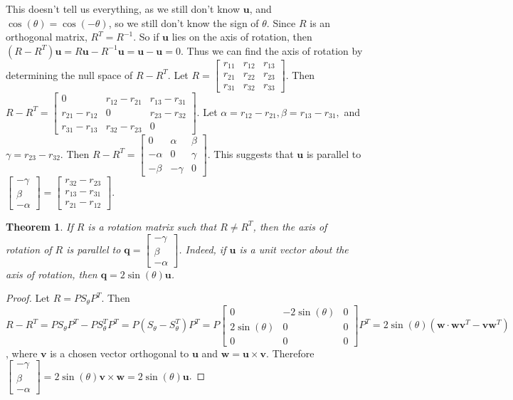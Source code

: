 \documentclass[oneside]{book}
\newtheorem{theorem}{Theorem}[section]
\theoremstyle{definition}
\newcommand*\B[1]{\mathbf{#1}}
\begin{document}
This doesn't tell us everything, as we still don't know $\B{u}$, and $\cos(\theta) = \cos(-\theta)$, so we still don't know the sign of $\theta$. Since $R$ is an orthogonal matrix, $R^T = R^{-1}$. So if $\B{u}$ lies on the axis of rotation, then $(R-R^T)\B{u} = R\B{u}-R^{-1}\B{u} = \B{u}-\B{u} = 0$. Thus we can find the axis of rotation by determining the null space of $R-R^T$. Let $R = \begin{bmatrix} r_{11} & r_{12} & r_{13} \\ r_{21} & r_{22} & r_{23} \\ r_{31} & r_{32} & r_{33} \end{bmatrix}$. Then $R-R^T = \begin{bmatrix} 0 & r_{12} - r_{21} & r_{13} - r_{31} \\ r_{21} - r_{12} & 0 & r_{23}-r_{32} \\ r_{31} - r_{13} & r_{32} - r_{23} & 0 \end{bmatrix}$. Let $\alpha = r_{12} - r_{21},\beta = r_{13} - r_{31},$ and $\gamma = r_{23}-r_{32}$. Then $R-R^T = \begin{bmatrix} 0 & \alpha & \beta \\ -\alpha & 0 & \gamma \\ -\beta & -\gamma & 0 \end{bmatrix}$. This suggests that $\B{u}$ is parallel to $\begin{bmatrix} -\gamma \\ \beta \\ -\alpha \end{bmatrix} = \begin{bmatrix} r_{32}-r_{23} \\ r_{13}-r_{31} \\ r_{21}-r_{12} \end{bmatrix}$.

\begin{theorem}
If $R$ is a rotation matrix such that $R\ne R^T$, then the axis of rotation of $R$ is parallel to $\B{q}=\begin{bmatrix}-\gamma \\ \beta \\ -\alpha\end{bmatrix}$. Indeed, if $\B{u}$ is a unit vector about the axis of rotation, then $\B{q} = 2\sin(\theta)\B{u}$.
\end{theorem}
\begin{proof}
Let $R = PS_{\theta}P^T$. Then $R-R^T = PS_{\theta}P^T - PS_{\theta}^TP^T = P(S_{\theta}-S_{\theta}^T)P^T = P\begin{bmatrix}0 & -2\sin(\theta) & 0 \\ 2\sin(\theta) & 0 & 0 \\ 0 & 0 & 0 \end{bmatrix}P^T = 2\sin(\theta)(\B{w}\cdot \B{w}\B{v}^T - \B{v}\B{w}^T)$, where $\B{v}$ is a chosen vector orthogonal to $\B{u}$ and $\B{w} = \B{u}\times \B{v}$. Therefore $\begin{bmatrix} -\gamma \\ \beta \\ -\alpha \end{bmatrix} = 2\sin(\theta) \B{v}\times \B{w} = 2\sin(\theta) \B{u}$.
\end{proof}
\end{document}
